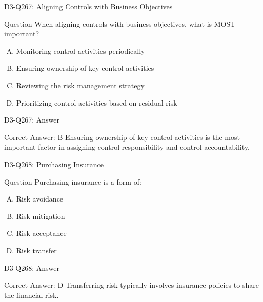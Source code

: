 \documentclass{beamer}
\begin{document}
	\begin{frame}{D3-Q267: Aligning Controls with Business Objectives}
		\begin{block}{Question}
			When aligning controls with business objectives, what is MOST important?
		\end{block}
		\begin{enumerate}[(A)]
			\item Monitoring control activities periodically
			\item Ensuring ownership of key control activities
			\item Reviewing the risk management strategy
			\item Prioritizing control activities based on residual risk
		\end{enumerate}
	\end{frame}
	\begin{frame}{D3-Q267: Answer}
		\begin{block}{Correct Answer: B}
			Ensuring ownership of key control activities is the most important factor in assigning control responsibility and control accountability.
		\end{block}
	\end{frame}
	
	\begin{frame}{D3-Q268: Purchasing Insurance}
		\begin{block}{Question}
			Purchasing insurance is a form of:
		\end{block}
		\begin{enumerate}[(A)]
			\item Risk avoidance
			\item Risk mitigation
			\item Risk acceptance
			\item Risk transfer
		\end{enumerate}
	\end{frame}
	\begin{frame}{D3-Q268: Answer}
		\begin{block}{Correct Answer: D}
			Transferring risk typically involves insurance policies to share the financial risk.
		\end{block}
	\end{frame}
	
\end{document}
